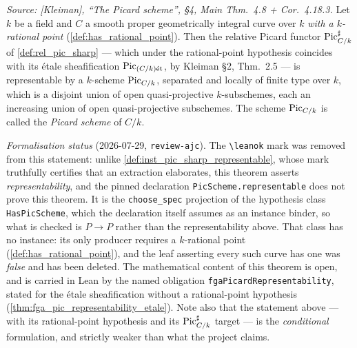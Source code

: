 \begin{theorem}
  \label{thm:fga_pic_representability}
  \textit{Source: [Kleiman], ``The Picard scheme'', \S 4, Main Thm.~4.8
  + Cor.~4.18.3.}
  Let \(k\) be a field and \(C\) a smooth proper geometrically integral curve
  over \(k\) \emph{with a \(k\)-rational point}
  (\cref{def:has_rational_point}). Then the relative Picard functor
  \(\operatorname{Pic}^\sharp_{C/k}\) of \cref{def:rel_pic_sharp} --- which under the
  rational-point hypothesis coincides with its \'etale sheafification
  \(\operatorname{Pic}_{(C/k)\mathrm{\acute{e}t}}\), by Kleiman \S 2, Thm.~2.5 --- is representable by a
  \(k\)-scheme \(\operatorname{Pic}_{C/k}\), separated and locally of finite type over
  \(k\), which is a disjoint union of open quasi-projective
  \(k\)-subschemes, each an increasing union of open quasi-projective
  subschemes. The scheme \(\operatorname{Pic}_{C/k}\) is called the \emph{Picard scheme}
  of \(C/k\).

  \emph{Formalisation status} (2026-07-29, \texttt{review-ajc}). The
  \texttt{\textbackslash leanok} mark was removed from this statement: unlike
  \cref{def:inst_pic_sharp_representable}, whose mark truthfully certifies that
  an extraction elaborates, this theorem asserts \emph{representability}, and the
  pinned declaration
  \texttt{PicScheme.representable} does not prove this theorem. It is the
  \texttt{choose\_spec} projection of the hypothesis class
  \texttt{HasPicScheme}, which the declaration itself assumes as an instance
  binder, so what is checked is \(P \to P\) rather than the representability
  above. That class has no instance: its only producer requires a
  \(k\)-rational point (\cref{def:has_rational_point}), and the leaf asserting
  every such curve has one was \emph{false} and has been deleted. The
  mathematical content of this theorem is open, and is carried in Lean by the
  named obligation \texttt{fgaPicardRepresentability}, stated for the
  \'etale sheafification without a rational-point hypothesis
  (\cref{thm:fga_pic_representability_etale}). Note also that the statement
  above --- with its rational-point hypothesis and its
  \(\operatorname{Pic}^\sharp_{C/k}\) target --- is the \emph{conditional} formulation, and
  strictly weaker than what the project claims.
\end{theorem}

